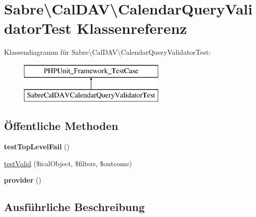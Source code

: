 \hypertarget{class_sabre_1_1_cal_d_a_v_1_1_calendar_query_validator_test}{}\section{Sabre\textbackslash{}Cal\+D\+AV\textbackslash{}Calendar\+Query\+Validator\+Test Klassenreferenz}
\label{class_sabre_1_1_cal_d_a_v_1_1_calendar_query_validator_test}
Klassendiagramm für Sabre\textbackslash{}Cal\+D\+AV\textbackslash{}Calendar\+Query\+Validator\+Test\+:\begin{figure}[H]
\begin{center}
\leavevmode
\includegraphics[height=2.000000cm]{class_sabre_1_1_cal_d_a_v_1_1_calendar_query_validator_test}
\end{center}
\end{figure}
\subsection*{Öffentliche Methoden}
\begin{DoxyCompactItemize}
\item 
\mbox{\label{class_sabre_1_1_cal_d_a_v_1_1_calendar_query_validator_test_aa1c3d8d487e53538b284167d7cbb063e}} 
{\bfseries test\+Top\+Level\+Fail} ()
\item 
\mbox{\hyperlink{class_sabre_1_1_cal_d_a_v_1_1_calendar_query_validator_test_a0f9bf26de98255c20ca61f72d50a6861}{test\+Valid}} (\$ical\+Object, \$filters, \$outcome)
\item 
\mbox{\label{class_sabre_1_1_cal_d_a_v_1_1_calendar_query_validator_test_a044c8b7701f037b30a4d4c9eb64c9971}} 
{\bfseries provider} ()
\end{DoxyCompactItemize}


\subsection{Ausführliche Beschreibung}


